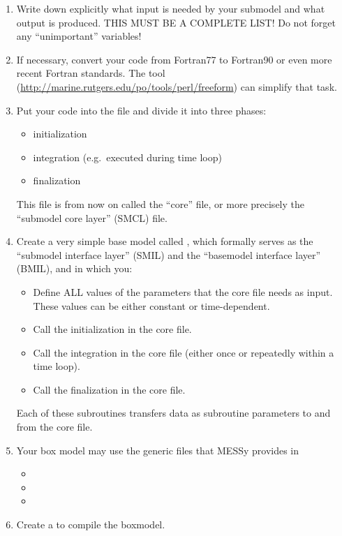 \documentclass[a4paper,12pt,twoside]{article}
\def\nosep{\setlength\parsep{0mm}\setlength\topsep{0mm}\setlength\itemsep{0mm}}
\begin{document}
\begin{enumerate}\nosep
\item Write down explicitly what input is needed by your submodel and
  what output is produced. THIS MUST BE A COMPLETE LIST! Do not forget
  any ``unimportant'' variables!
\item If necessary, convert your code from Fortran77 to Fortran90 or even more
  recent Fortran standards. The
  tool 
  (\url{http://marine.rutgers.edu/po/tools/perl/freeform}) can simplify
  that task.
\item Put your code into the file  and
  divide it into three phases:
  \begin{itemize}\nosep
  \item initialization
  \item integration (e.g.\ executed during time loop)
  \item finalization
  \end{itemize}
  This file is from now on called the ``core'' file, or more precisely
  the ``submodel core layer'' (SMCL) file.
\item Create a very simple base model called , which formally serves as the ``submodel interface
  layer'' (SMIL) and the ``basemodel interface layer'' (BMIL), and in which
  you: 
  \begin{itemize}\nosep 
   \item Define ALL values of the parameters that
         the core file needs as input. These values can be either constant or
         time-dependent.  
   \item Call the initialization in the core file.  
   \item Call the integration in the core file (either once or repeatedly 
         within a time loop).  
   \item Call the finalization in the core file.  
  \end{itemize} 
  Each of these subroutines transfers data as subroutine parameters to and
  from the core file.
\item Your box model may use the generic files that MESSy provides in
  \begin{itemize}\nosep
  \item {}
  \item {}
  \item {}
  \end{itemize} 
\item Create a  to compile the boxmodel.
\end{enumerate}
\end{document}
